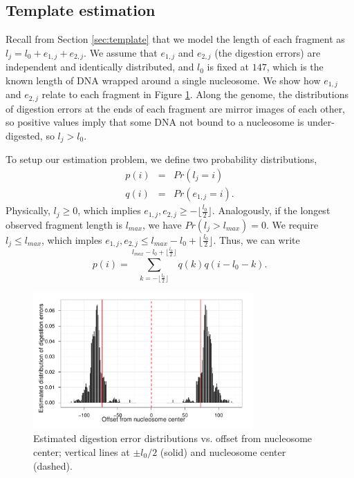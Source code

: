 \subsection{Template estimation}
\label{sec:templateEstimation}

Recall from Section \ref{sec:template} that we model the length of each fragment as $ l_j = l_0 + e_{1,j} + e_{2,j} $.
We assume that $e_{1,j}$ and $e_{2,j}$ (the digestion errors) are independent and identically distributed, and $l_0$ is fixed at $147$, which is the known length of DNA wrapped around a single nucleosome.
We show how $e_{1,j}$ and $e_{2,j}$ relate to each fragment in Figure \ref{fig:digestErrors}.
Along the genome, the distributions of digestion errors at the ends of each fragment are mirror images of each other, so positive values imply that some DNA not bound to a nucleosome is under-digested, so $l_j > l_0$.

To setup our estimation problem, we define two probability distributions,
\begin{eqnarray}
 p(i) &=& Pr \left( l_j = i \right) \\
 q(i) &=& Pr \left( e_{1,j} = i \right).
\end{eqnarray}
Physically, $l_j \geq0$, which implies $e_{1,j}, e_{2,j} \geq - \lfloor \frac{l_0}{2} \rfloor$. Analogously, if the longest observed fragment length is
$l_{max}$, we have  $Pr \left( l_j > l_{max} \right) = 0$. We require $l_j\leq l_{max}$, which imples $e_{1,j}, e_{2,j} \leq l_{max} - l_0 + \lfloor \frac{l_0}{2} \rfloor$. Thus, we can write 
\begin{equation}
 p(i) = \sum_{k=-\lfloor \frac{l_0}{2} \rfloor}^{l_{max} - l_0 + \lfloor
\frac{l_0}{2} \rfloor} q(k) q(i - l_0 - k).
\end{equation}

\ifx\nofigures\undefined
\begin{figure}
\centering
\includegraphics[width=0.75\textwidth]{figures/nucleosomes/plotDigestionDist_histogram}
\caption{Estimated digestion error distributions vs. offset from nucleosome
center; vertical lines at $\pm l_0 / 2$ (solid) and nucleosome center (dashed).
\label{fig:digestErrors}}
\end{figure}
\fi

